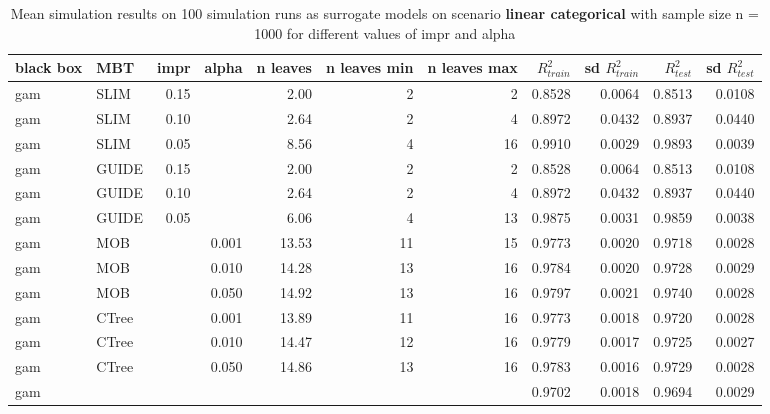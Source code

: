 \begin{table}
\begin{tabular}[t]{l|l|r|r|r|r|r|r|r|r|r}
\hline
\end{tabular}
\label{tab:app_linear_smooth_5000}

\end{table}



\begin{table}

\caption{Mean simulation results on 100 simulation runs as surrogate models  on scenario \textbf{linear categorical} with sample size n = 1000 for different values of impr and alpha}
\centering \tiny
\begin{tabular}[t]{l|l|r|r|r|r|r|r|r|r|r}
\hline
black box & MBT & impr & alpha & n leaves & n leaves min & n leaves max &  $R^2_{train}$ & sd $R^2_{train}$ & $R^2_{test}$ & sd $R^2_{test}$\\
\hline
gam & SLIM & 0.15 & & 2.00 & 2 & 2 & 0.8528 & 0.0064 & 0.8513 & 0.0108\\
gam & SLIM & 0.10 & & 2.64 & 2 & 4 & 0.8972 & 0.0432 & 0.8937 & 0.0440\\
gam & SLIM & 0.05 & & 8.56 & 4 & 16 & 0.9910 & 0.0029 & 0.9893 & 0.0039\\
gam & GUIDE & 0.15 & & 2.00 & 2 & 2 & 0.8528 & 0.0064 & 0.8513 & 0.0108\\
gam & GUIDE & 0.10 & & 2.64 & 2 & 4 & 0.8972 & 0.0432 & 0.8937 & 0.0440\\
gam & GUIDE & 0.05 & & 6.06 & 4 & 13 & 0.9875 & 0.0031 & 0.9859 & 0.0038\\
gam & MOB & & 0.001 & 13.53 & 11 & 15 & 0.9773 & 0.0020 & 0.9718 & 0.0028\\
gam & MOB & & 0.010 & 14.28 & 13 & 16 & 0.9784 & 0.0020 & 0.9728 & 0.0029\\
gam & MOB & & 0.050 & 14.92 & 13 & 16 & 0.9797 & 0.0021 & 0.9740 & 0.0028\\
gam & CTree & & 0.001 & 13.89 & 11 & 16 & 0.9773 & 0.0018 & 0.9720 & 0.0028\\
gam & CTree & & 0.010 & 14.47 & 12 & 16 & 0.9779 & 0.0017 & 0.9725 & 0.0027\\
gam & CTree & & 0.050 & 14.86 & 13 & 16 & 0.9783 & 0.0016 & 0.9729 & 0.0028\\
\hline
gam & & & & & & & 0.9702 & 0.0018 & 0.9694 & 0.0029\\
\hline


\end{tabular}
\end{table}
